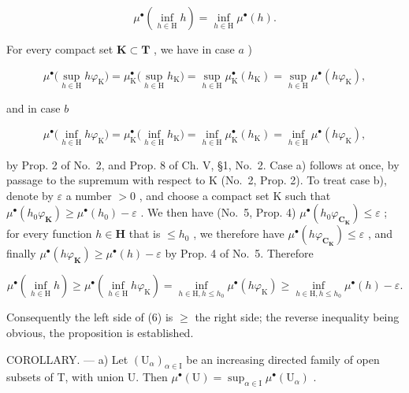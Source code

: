 \[
\mu^ {\bullet} \left(\inf _ {h \in \mathrm{H}} h\right) = \inf _ {h \in \mathrm{H}} \mu^ {\bullet} (h).\tag{6}
\]

For every compact set \(\mathbf{K} \subset \mathbf{T}\) , we have in case \(a\) )

\[
\mu^ {\bullet} \Big (\sup _ {h \in \mathrm{H}} h \varphi_ {\mathrm{K}} \Big) = \mu_ {\mathrm{K}} ^ {\bullet} \Big (\sup _ {h \in \mathrm{H}} h _ {\mathrm{K}} \Big) = \sup _ {h \in \mathrm{H}} \mu_ {\mathrm{K}} ^ {\bullet} (h _ {\mathrm{K}}) = \sup _ {h \in \mathrm{H}} \mu^ {\bullet} (h \varphi_ {\mathrm{K}}),
\]

and in case \(b\)

\[
\mu^ {\bullet} \Big (\inf _ {h \in \mathrm{H}} h \varphi_ {\mathrm{K}} \Big) = \mu_ {\mathrm{K}} ^ {\bullet} \Big (\inf _ {h \in \mathrm{H}} h _ {\mathrm{K}} \Big) = \inf _ {h \in \mathrm{H}} \mu_ {\mathrm{K}} ^ {\bullet} (h _ {\mathrm{K}}) = \inf _ {h \in \mathrm{H}} \mu^ {\bullet} (h \varphi_ {\mathrm{K}}),
\]

by Prop. 2 of No.~2, and Prop. 8 of Ch. V, §1, No.~2. Case a) follows at once, by passage to the supremum with respect to K (No.~2, Prop. 2). To treat case b), denote by \(\varepsilon\) a number \(>0\) , and choose a compact set K such that \(\mu^{\bullet}(h_0\varphi_{\mathbf{K}}) \geqslant \mu^{\bullet}(h_0) - \varepsilon\) . We then have (No.~5, Prop. 4) \(\mu^{\bullet}(h_0\varphi_{\mathbf{C}_{\mathbf{K}}}) \leqslant \varepsilon\) ; for every function \(h \in \mathbf{H}\) that is \(\leqslant h_0\) , we therefore have \(\mu^{\bullet}(h\varphi_{\mathbf{C}_{\mathbf{K}}}) \leqslant \varepsilon\) , and finally \(\mu^{\bullet}(h\varphi_{\mathbf{K}}) \geqslant \mu^{\bullet}(h) - \varepsilon\) by Prop. 4 of No.~5. Therefore

\[
\mu^ {\bullet} \left(\inf _ {h \in \mathrm{H}} h\right) \geqslant \mu^ {\bullet} \left(\inf _ {h \in \mathrm{H}} h \varphi_ {\mathrm{K}}\right) = \inf _ {h \in \mathrm{H}, h \leqslant h _ {0}} \mu^ {\bullet} (h \varphi_ {\mathrm{K}}) \geqslant \inf _ {h \in \mathrm{H}, h \leqslant h _ {0}} \mu^ {\bullet} (h) - \varepsilon .
\]

Consequently the left side of (6) is \(\geqslant\) the right side; the reverse inequality being obvious, the proposition is established.

COROLLARY. --- a) Let \((\mathrm{U}_{\alpha})_{\alpha \in \mathrm{I}}\) be an increasing directed family of open subsets of T, with union U. Then \(\mu^{\bullet}(\mathrm{U}) = \sup_{\alpha \in \mathrm{I}} \mu^{\bullet}(\mathrm{U}_{\alpha})\) .

